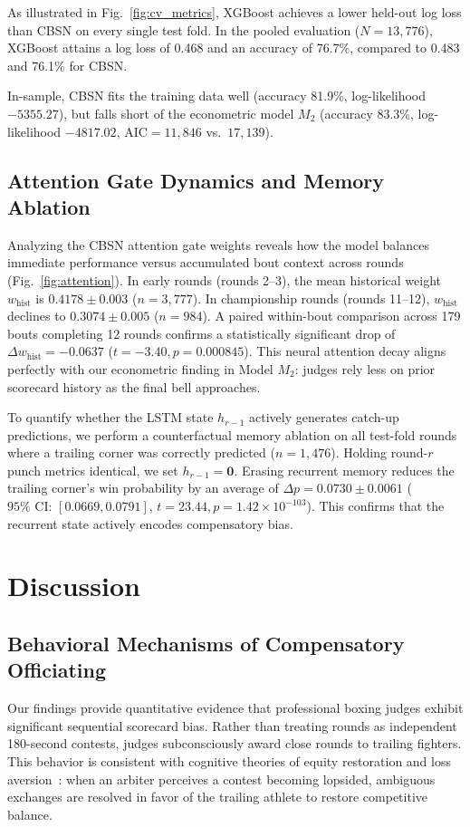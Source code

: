 \documentclass[conference]{IEEEtran}
\begin{document}
As illustrated in Fig.~\ref{fig:cv_metrics}, XGBoost achieves a lower held-out log loss than CBSN on every single test fold. In the pooled evaluation ($N = 13,776$), XGBoost attains a log loss of 0.468 and an accuracy of 76.7\%, compared to 0.483 and 76.1\% for CBSN. 

In-sample, CBSN fits the training data well (accuracy 81.9\%, log-likelihood $-5355.27$), but falls short of the econometric model $M_2$ (accuracy 83.3\%, log-likelihood $-4817.02$, $\text{AIC} = 11,846$ vs.\ $17,139$).

\subsection{Attention Gate Dynamics and Memory Ablation}
Analyzing the CBSN attention gate weights reveals how the model balances immediate performance versus accumulated bout context across rounds (Fig.~\ref{fig:attention}). In early rounds (rounds 2--3), the mean historical weight $w_{\text{hist}}$ is $0.4178 \pm 0.003$ ($n = 3,777$). In championship rounds (rounds 11--12), $w_{\text{hist}}$ declines to $0.3074 \pm 0.005$ ($n = 984$). A paired within-bout comparison across 179 bouts completing 12 rounds confirms a statistically significant drop of $\Delta w_{\text{hist}} = -0.0637$ ($t = -3.40, p = 0.000845$). This neural attention decay aligns perfectly with our econometric finding in Model $M_2$: judges rely less on prior scorecard history as the final bell approaches.

To quantify whether the LSTM state $h_{r-1}$ actively generates catch-up predictions, we perform a counterfactual memory ablation on all test-fold rounds where a trailing corner was correctly predicted ($n = 1,476$). Holding round-$r$ punch metrics identical, we set $h_{r-1} = \mathbf{0}$. Erasing recurrent memory reduces the trailing corner's win probability by an average of $\Delta p = 0.0730 \pm 0.0061$ ($95\%\text{ CI: } [0.0669, 0.0791]$, $t = 23.44, p = 1.42 \times 10^{-103}$). This confirms that the recurrent state actively encodes compensatory bias.

\section{Discussion}

\subsection{Behavioral Mechanisms of Compensatory Officiating}
Our findings provide quantitative evidence that professional boxing judges exhibit significant sequential scorecard bias. Rather than treating rounds as independent 180-second contests, judges subconsciously award close rounds to trailing fighters. This behavior is consistent with cognitive theories of equity restoration and loss aversion~\cite{chen2016,peters2014}: when an arbiter perceives a contest becoming lopsided, ambiguous exchanges are resolved in favor of the trailing athlete to restore competitive balance.
\end{document}
